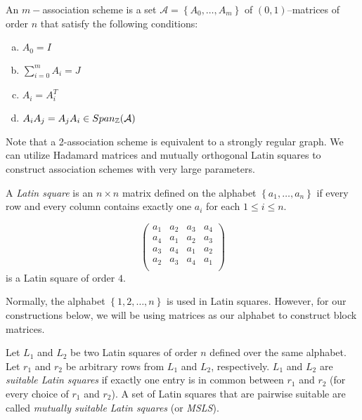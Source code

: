 \begin{definition} \label{def:ass-scheme}
 An $m-$association scheme is a set $\mathcal{A} = \left\{A_0, \dots , A_m\right\}$ of $(0,1)$--matrices of order $n$ that satisfy the following conditions:
 \begin{enumerate}[(a)]
  \item $A_0 = I$
  \item $\sum_{i=0}^m A_i = J$
  \item $A_i = A_i^T$
  \item $A_iA_j = A_jA_i \in Span_{\mathbb{Z}}(\mathcal{A})$
 \end{enumerate}
\end{definition}

Note that a 2-association scheme is equivalent to a strongly regular graph. We can utilize Hadamard matrices and mutually orthogonal Latin squares to construct association schemes with very large parameters.

\begin{definition}\label{def:latin}
 A {\it Latin square} is an $n \times n$ matrix defined on the alphabet $\left\{a_1,\dots,a_n\right\}$ if every row and every column contains exactly one $a_i$ for each $1 \leq i \leq n$.
\end{definition}

\begin{example}\label{ex:latin}
 $$\left(\begin{array}{cccc}
          a_1 & a_2 & a_3 & a_4 \\
          a_4 & a_1 & a_2 & a_3 \\
          a_3 & a_4 & a_1 & a_2 \\
          a_2 & a_3 & a_4 & a_1 \\
         \end{array}
\right)$$ is a Latin square of order $4$.
\end{example}

Normally, the alphabet $\left\{1,2,\dots,n\right\}$ is used in Latin squares. However, for our constructions below, we will be using matrices as our alphabet to construct block matrices.

\begin{definition}\label{def:msls}
 Let $L_1$ and $L_2$ be two Latin squares of order $n$ defined over the same alphabet. Let $r_1$ and $r_2$ be arbitrary rows from $L_1$ and $L_2$, respectively. $L_1$ and $L_2$ are {\it suitable Latin squares} if exactly one entry is in common between $r_1$ and $r_2$ (for every choice of $r_1$ and $r_2$). A set of Latin squares that are pairwise suitable are called {\it mutually suitable Latin squares} (or {\it MSLS}).
\end{definition}

